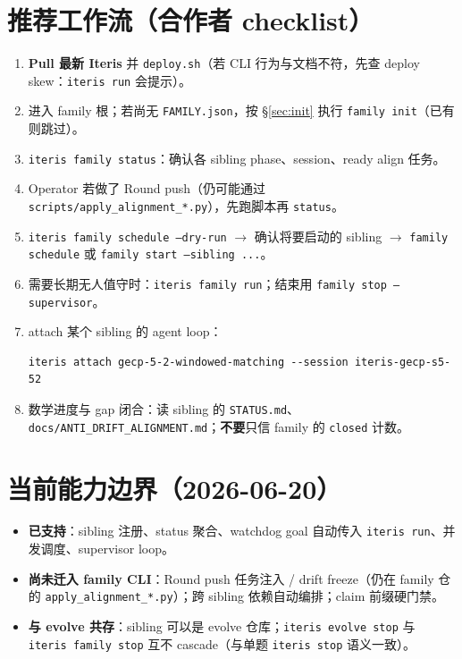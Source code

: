 \documentclass[11pt,a4paper]{ctexart}
\begin{document}
\section{推荐工作流（合作者 checklist）}

\begin{enumerate}
  \item \textbf{Pull 最新 Iteris} 并 \texttt{deploy.sh}（若 CLI 行为与文档不符，先查 deploy skew：\texttt{iteris run} 会提示）。
  \item 进入 family 根；若尚无 \texttt{FAMILY.json}，按 §\ref{sec:init} 执行 \texttt{family init}（已有则跳过）。
  \item \texttt{iteris family status}：确认各 sibling phase、session、ready align 任务。
  \item Operator 若做了 Round push（仍可能通过 \texttt{scripts/apply\_alignment\_*.py}），先跑脚本再 \texttt{status}。
  \item \texttt{iteris family schedule --dry-run} $\to$ 确认将要启动的 sibling $\to$ \texttt{family schedule} 或 \texttt{family start --sibling ...}。
  \item 需要长期无人值守时：\texttt{iteris family run}；结束用 \texttt{family stop --supervisor}。
  \item attach 某个 sibling 的 agent loop：
    \begin{lstlisting}[style=shell]
iteris attach gecp-5-2-windowed-matching --session iteris-gecp-s5-52
    \end{lstlisting}
  \item 数学进度与 gap 闭合：读 sibling 的 \texttt{STATUS.md}、\texttt{docs/ANTI\_DRIFT\_ALIGNMENT.md}；\textbf{不要}只信 family 的 \texttt{closed} 计数。
\end{enumerate}

\section{当前能力边界（2026-06-20）}

\begin{itemize}
  \item \textbf{已支持}：sibling 注册、status 聚合、watchdog goal 自动传入 \texttt{iteris run}、并发调度、supervisor loop。
  \item \textbf{尚未迁入 family CLI}：Round push 任务注入 / drift freeze（仍在 family 仓的 \texttt{apply\_alignment\_*.py}）；跨 sibling 依赖自动编排；claim 前缀硬门禁。
  \item \textbf{与 evolve 共存}：sibling 可以是 evolve 仓库；\texttt{iteris evolve stop} 与 \texttt{iteris family stop} 互不 cascade（与单题 \texttt{iteris stop} 语义一致）。
\end{itemize}
\end{document}
